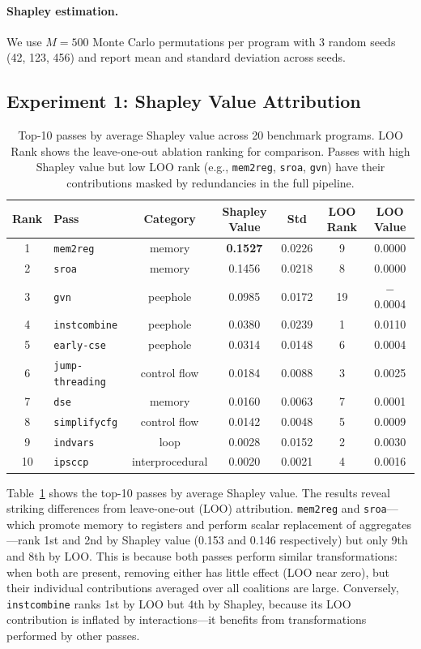 \documentclass{article}
\begin{document}
\paragraph{Shapley estimation.} We use $M = 500$ Monte Carlo permutations per program with 3 random seeds (42, 123, 456) and report mean and standard deviation across seeds.

\subsection{Experiment 1: Shapley Value Attribution}

\begin{table}[t]
\caption{Top-10 passes by average Shapley value across 20 benchmark programs. LOO Rank shows the leave-one-out ablation ranking for comparison. Passes with high Shapley value but low LOO rank (e.g., \texttt{mem2reg}, \texttt{sroa}, \texttt{gvn}) have their contributions masked by redundancies in the full pipeline.}
\label{tab:top_passes}
\centering
\begin{tabular}{clccccc}
\toprule
Rank & Pass & Category & Shapley Value & Std & LOO Rank & LOO Value \\
\midrule
1 & \texttt{mem2reg} & memory & \textbf{0.1527} & 0.0226 & 9 & 0.0000 \\
2 & \texttt{sroa} & memory & 0.1456 & 0.0218 & 8 & 0.0000 \\
3 & \texttt{gvn} & peephole & 0.0985 & 0.0172 & 19 & $-$0.0004 \\
4 & \texttt{instcombine} & peephole & 0.0380 & 0.0239 & 1 & 0.0110 \\
5 & \texttt{early-cse} & peephole & 0.0314 & 0.0148 & 6 & 0.0004 \\
6 & \texttt{jump-threading} & control flow & 0.0184 & 0.0088 & 3 & 0.0025 \\
7 & \texttt{dse} & memory & 0.0160 & 0.0063 & 7 & 0.0001 \\
8 & \texttt{simplifycfg} & control flow & 0.0142 & 0.0048 & 5 & 0.0009 \\
9 & \texttt{indvars} & loop & 0.0028 & 0.0152 & 2 & 0.0030 \\
10 & \texttt{ipsccp} & interprocedural & 0.0020 & 0.0021 & 4 & 0.0016 \\
\bottomrule
\end{tabular}
\end{table}

Table~\ref{tab:top_passes} shows the top-10 passes by average Shapley value. The results reveal striking differences from leave-one-out (LOO) attribution. \texttt{mem2reg} and \texttt{sroa}---which promote memory to registers and perform scalar replacement of aggregates---rank 1st and 2nd by Shapley value (0.153 and 0.146 respectively) but only 9th and 8th by LOO. This is because both passes perform similar transformations: when both are present, removing either has little effect (LOO near zero), but their individual contributions averaged over all coalitions are large. Conversely, \texttt{instcombine} ranks 1st by LOO but 4th by Shapley, because its LOO contribution is inflated by interactions---it benefits from transformations performed by other passes.
\end{document}

